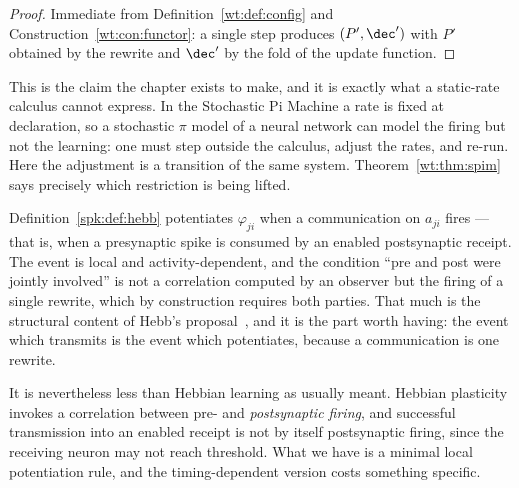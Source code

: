 \begin{proof}
Immediate from Definition~\ref{wt:def:config} and Construction~\ref{wt:con:functor}: a
single step produces $(P',\dec')$ with $P'$ obtained by the rewrite and $\dec'$ by the
fold of the update function.
\end{proof}

This is the claim the chapter exists to make, and it is exactly what a static-rate
calculus cannot express. In the Stochastic Pi Machine a rate is fixed at declaration, so
a stochastic $\pi$ model of a neural network can model the firing but not the learning:
one must step outside the calculus, adjust the rates, and re-run. Here the adjustment is
a transition of the same system. Theorem~\ref{wt:thm:spim} says precisely which
restriction is being lifted.

\begin{remark}
\label{spk:rmk:hebbian}
Definition~\ref{spk:def:hebb} potentiates $\varphi_{ji}$ when a communication on $a_{ji}$
fires --- that is, when a presynaptic spike is consumed by an enabled postsynaptic
receipt. The event is local and activity-dependent, and the condition ``pre and post were
jointly involved'' is not a correlation computed by an observer but the firing of a
single rewrite, which by construction requires both parties. That much is the structural
content of Hebb's proposal~\cite{hebb}, and it is the part worth having: the event which
transmits is the event which potentiates, because a communication is one rewrite.

It is nevertheless less than Hebbian learning as usually meant. Hebbian plasticity
invokes a correlation between pre- and \emph{postsynaptic firing}, and successful
transmission into an enabled receipt is not by itself postsynaptic firing, since the
receiving neuron may not reach threshold. What we have is a minimal local potentiation
rule, and the timing-dependent version costs something specific.
\end{remark}

